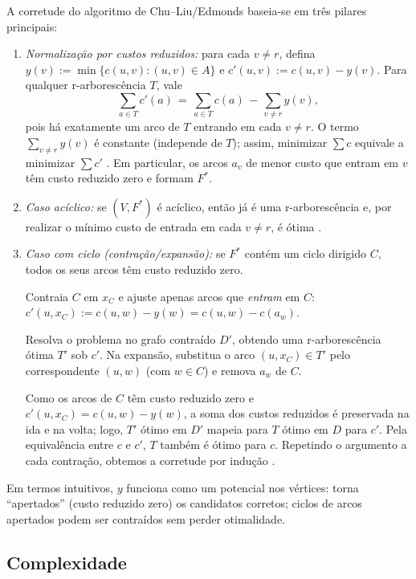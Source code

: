 A corretude do algoritmo de Chu–Liu/Edmonds baseia-se em três pilares principais:
\begin{enumerate}\setlength{\itemsep}{2pt}
    \item \emph{Normalização por custos reduzidos:} para cada \(v\neq r\), defina \(y(v):=\min\{c(u,v):(u,v)\in A\}\) e \(c'(u,v):=c(u,v)-y(v)\). Para qualquer r-arborescência \(T\), vale
          \[
              \sum_{a\in T} c'(a) \,=\, \sum_{a\in T} c(a) \, - \, \sum_{v\neq r} y(v),
          \]
          pois há exatamente um arco de \(T\) entrando em cada \(v\neq r\). O termo \(\sum_{v\neq r} y(v)\) é constante (independe de \(T\)); assim, minimizar \(\sum c\) equivale a minimizar \(\sum c'\) \cite[Obs.~4.37]{kleinberg2006}. Em particular, os arcos \(a_v\) de menor custo que entram em \(v\) têm custo reduzido zero e formam \(F^*\).
    \item \emph{Caso acíclico:} se \((V,F^*)\) é acíclico, então já é uma r-arborescência e, por realizar o mínimo custo de entrada em cada \(v\neq r\), é ótima \cite[Obs.~4.36]{kleinberg2006}.
    \item \emph{Caso com ciclo (contração/expansão):} se \(F^*\) contém um ciclo dirigido \(C\), todos os seus arcos têm custo reduzido zero.

          Contraia \(C\) em \(x_C\) e ajuste apenas arcos que \emph{entram} em \(C\): \(c'(u,x_C):=c(u,w)-y(w)=c(u,w)-c(a_w)\).

          Resolva o problema no grafo contraído \(D'\), obtendo uma r-arborescência ótima \(T'\) sob \(c'\). Na expansão, substitua o arco \((u,x_C)\in T'\) pelo correspondente \((u,w)\) (com \(w\in C\)) e remova \(a_w\) de \(C\).

          Como os arcos de \(C\) têm custo reduzido zero e \(c'(u,x_C)=c(u,w)-y(w)\), a soma dos custos reduzidos é preservada na ida e na volta; logo, \(T'\) ótimo em \(D'\) mapeia para \(T\) ótimo em \(D\) para \(c'\). Pela equivalência entre \(c\) e \(c'\), \(T\) também é ótimo para \(c\). Repetindo o argumento a cada contração, obtemos a corretude por indução \cite[Sec.~4.9]{kleinberg2006,schrijver2003comb}.
\end{enumerate}
Em termos intuitivos, \(y\) funciona como um potencial nos vértices: torna “apertados” (custo reduzido zero) os candidatos corretos; ciclos de arcos apertados podem ser contraídos sem perder otimalidade.

\subsection{Complexidade}


